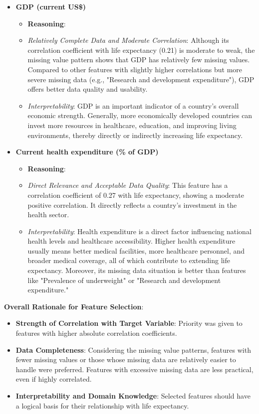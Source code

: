 \documentclass{article}
\begin{document}
\begin{itemize}
    \item \textbf{GDP (current US\$)}
    \begin{itemize}
        \item \textbf{Reasoning}:
        \item \textit{Relatively Complete Data and Moderate Correlation}: Although its correlation coefficient with life expectancy (0.21) is moderate to weak, the missing value pattern shows that GDP has relatively few missing values. Compared to other features with slightly higher correlations but more severe missing data (e.g., "Research and development expenditure"), GDP offers better data quality and usability.
        \item \textit{Interpretability}: GDP is an important indicator of a country's overall economic strength. Generally, more economically developed countries can invest more resources in healthcare, education, and improving living environments, thereby directly or indirectly increasing life expectancy.
    \end{itemize}

    \item \textbf{Current health expenditure (\% of GDP)}
    \begin{itemize}
        \item \textbf{Reasoning}:
        \item \textit{Direct Relevance and Acceptable Data Quality}: This feature has a correlation coefficient of 0.27 with life expectancy, showing a moderate positive correlation. It directly reflects a country's investment in the health sector.
        \item \textit{Interpretability}: Health expenditure is a direct factor influencing national health levels and healthcare accessibility. Higher health expenditure usually means better medical facilities, more healthcare personnel, and broader medical coverage, all of which contribute to extending life expectancy. Moreover, its missing data situation is better than features like "Prevalence of underweight" or "Research and development expenditure."
    \end{itemize}
\end{itemize}

\textbf{Overall Rationale for Feature Selection}:
\begin{itemize}
    \item \textbf{Strength of Correlation with Target Variable}: Priority was given to features with higher absolute correlation coefficients.
    \item \textbf{Data Completeness}: Considering the missing value patterns, features with fewer missing values or those whose missing data are relatively easier to handle were preferred. Features with excessive missing data are less practical, even if highly correlated.
    \item \textbf{Interpretability and Domain Knowledge}: Selected features should have a logical basis for their relationship with life expectancy.
\end{itemize}
\end{document}
